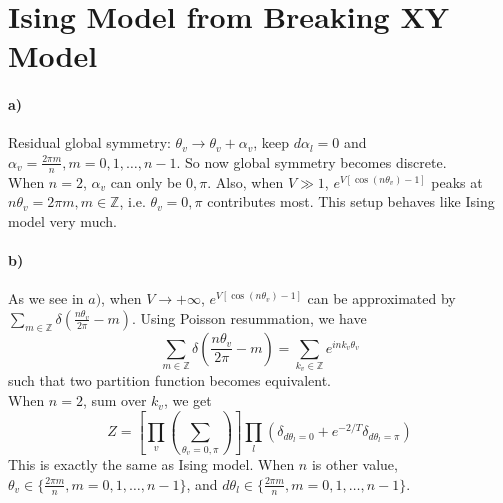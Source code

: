 \section{Ising Model from Breaking XY Model}
\paragraph*{a)} 
Residual global symmetry: $\theta_v \rightarrow \theta_v + \alpha_v$, keep $ d\alpha_l = 0$ and $ \alpha_v = \frac{2\pi m}{n}, m = 0, 1, \dots, n-1 $. So now global symmetry becomes discrete.\\
When $n = 2$, $\alpha_v$ can only be ${0, \pi}$. Also, when $V \gg 1$, $ e^{V[\cos(n\theta_v) - 1]}$ peaks at $n\theta_v = 2\pi m, m\in \mathbb{Z}$, i.e. $\theta_v = 0, \pi $ contributes most. This setup behaves like Ising model very much.

\paragraph*{b)} 
As we see in $a)$, when $V \rightarrow +\infty $, $ e^{V[\cos(n\theta_v) - 1]}$ can be approximated by $ \sum_{m \in \mathbb{Z}} \delta (\frac{n\theta_v}{2\pi} - m)$. Using Poisson resummation, we have
\begin{equation}
    \sum_{m \in \mathbb{Z}} \delta (\frac{n\theta_v}{2\pi} - m)
    = \sum_{k_v \in \mathbb{Z}} e^{in k_v \theta_v}
\end{equation}
such that two partition function becomes equivalent.\\
When $n = 2$, sum over $k_v$, we get 
\begin{equation}
    Z = \left[ \prod_{v} \left(\sum_{\theta_v = 0, \pi}\right)\right]
    \prod_{l} \left(\delta_{d\theta_l = 0} + e^{-2/T} \delta_{d\theta_l = \pi}\right)
\end{equation}
This is exactly the same as Ising model. When $n$ is other value, $\theta_v \in \{ \frac{2\pi m}{n}, m = 0, 1, \dots, n-1\}$, and $d\theta_l \in \{ \frac{2\pi m}{n}, m = 0, 1, \dots, n-1\}$. 

